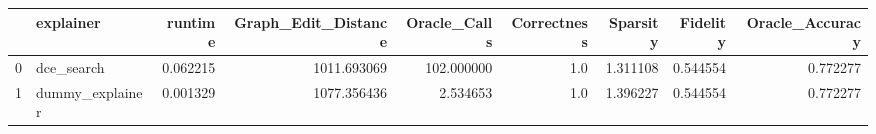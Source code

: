 \begin{tabular}{llrrrrrrr}
\toprule
{} &        explainer &   runtime &  Graph\_Edit\_Distance &  Oracle\_Calls &  Correctness &  Sparsity &  Fidelity &  Oracle\_Accuracy \\
\midrule
0 &       dce\_search &  0.062215 &          1011.693069 &    102.000000 &          1.0 &  1.311108 &  0.544554 &         0.772277 \\
1 &  dummy\_explainer &  0.001329 &          1077.356436 &      2.534653 &          1.0 &  1.396227 &  0.544554 &         0.772277 \\
\bottomrule
\end{tabular}

